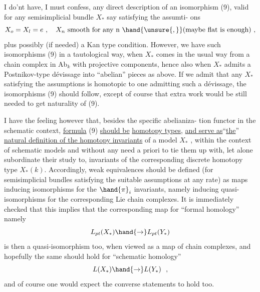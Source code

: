 
I do'nt have,  I must confess,  any direct description of  an isomorphism
(9),  valid for any semisimplicial bundle $X_{*}$  say satisfying the assumti-%
ons
\[ X_o=X_l= e \ , \quad X_n \text{ smooth for any n } \hand{\unsure{,}}\text{(maybe flat is enough) ,} \]
plus possibly (if needed) a Kan type condition.  However,  we have
such isomorphisms (9) in a tautological way,  when $X_{*}$  comes  in the
usual way from a chain complex in Ab$_k$  with projective components,  hence
also when $X_{*}$  admits a Postnikov-type dévissage into ``abelian'' pieces as
above.  If we admit that any $X_{*}$  satisfying the assumptions is homotopic
to one admitting such a dévissage,  the isomorphisms (9) should follow,
except of course that extra work would be still needed to get naturality
of (9).

I have the feeling however that,  besides the specific abelianiza-%
tion functor in the schematic context,  \uline{formula} (9) \uline{should be}  
   \uline{homotopy types},  \uline{and serve as}``\uline{the}''
\uline{natural definition of the homotopy invariants} of a model $X_{*}$ ,  within the
context of schematic models and without any need a priori to 
 tie them up with,  let alone subordinate their study\hand{\unsure{,}} to,  
invariants of  the corresponding discrete homotopy
type $X_{*}(k)$.  Accordingly,   weak equivalences should be defined 
 (for semisimplicial bundles satisfying the suitable assumptions at
any rate)  as maps inducing isomorphisms for the $\hand{\pi}_i$ invariants,  namely
inducing quasi-isomorphisms for the corresponding Lie chain complexes.
It is immediately checked that this implies that the corresponding map
for ``formal homology'' namely
\[ L_{pt}(X_{*}) \hand{\to} L_{pt}(Y_{*}) \]
is then a quasi-isomorphism too,  when viewed as a map of chain complexes,
and hopefully the same should hold for ``schematic homology''
\[ L(X_{*}) \hand{\to} L(Y_{*}) \ \ , \]
and of course one would expect the converse statements to hold too.

